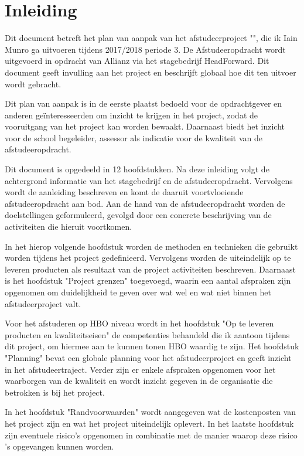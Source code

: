 \chapter{Inleiding}
Dit document betreft het plan van aanpak van het afstudeerproject "\thesisTitle", die ik Iain Munro ga uitvoeren tijdens 2017/2018 periode 3. De Afstudeeropdracht wordt uitgevoerd in opdracht van Allianz via het stagebedrijf HeadForward. Dit document geeft invulling aan het project en beschrijft globaal hoe dit ten uitvoer wordt gebracht.\par
Dit plan van aanpak is in de eerste plaatst bedoeld voor de opdrachtgever en anderen geïnteresseerden om inzicht te krijgen in het project, zodat de vooruitgang van het project kan worden bewaakt. Daarnaast biedt het inzicht voor de school begeleider, assessor als indicatie voor de kwaliteit van de afstudeeropdracht.\par
Dit document is opgedeeld in 12 hoofdstukken. Na deze inleiding volgt de achtergrond informatie van het stagebedrijf en de afstudeeropdracht. Vervolgens wordt de aanleiding beschreven en komt de daaruit voortvloeiende afstudeeropdracht aan bod. Aan de hand van de afstudeeropdracht worden de doelstellingen geformuleerd, gevolgd door een concrete beschrijving van de activiteiten die hieruit voortkomen.\par
In het hierop volgende hoofdstuk worden de methoden en technieken die gebruikt worden tijdens het project gedefinieerd. Vervolgens worden de uiteindelijk op te leveren producten als resultaat van de project activiteiten beschreven. Daarnaast is het hoofdstuk "Project grenzen" toegevoegd, waarin een aantal afspraken zijn opgenomen om duidelijkheid te geven over wat wel en wat niet binnen het afstudeerproject valt.\par
Voor het afstuderen op HBO niveau wordt in het hoofdstuk "Op te leveren producten en kwaliteitseisen" de competenties behandeld die ik aantoon tijdens dit project, om hiermee aan te kunnen tonen HBO waardig te zijn. Het hoofdstuk "Planning" bevat een globale planning voor het afstudeerproject en geeft inzicht in het afstudeertraject. Verder zijn er enkele afspraken opgenomen voor het waarborgen van de kwaliteit en wordt inzicht gegeven in de organisatie die betrokken is bij het project.\par
In het hoofdstuk "Randvoorwaarden" wordt aangegeven wat de kostenposten van het project zijn en wat het project uiteindelijk oplevert. In het laatste hoofdstuk zijn eventuele risico's opgenomen in combinatie met de manier waarop deze risico 's opgevangen kunnen worden.